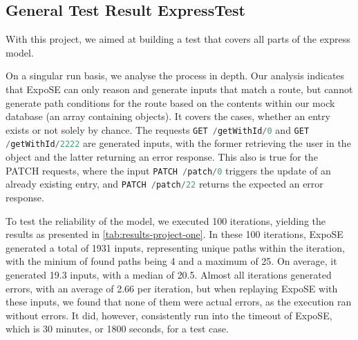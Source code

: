 \subsection{General Test Result ExpressTest}
With this project, we aimed at building a test that covers all parts of the express model.

On a singular run basis, we analyse the process in depth.
Our analysis indicates that ExpoSE can only reason and generate inputs that match a route, but cannot generate path conditions for the route based on the contents within our mock database (an array containing objects). It covers the cases, whether an entry exists or not solely by chance. The requests \lstinline[language=JavaScript]{GET /getWithId/0}
and \lstinline[language=JavaScript]{GET /getWithId/2222}
are generated inputs, with the former retrieving the user in the object and the latter returning an error response. This also is true for the PATCH requests, where the input \lstinline[language=JavaScript]{PATCH /patch/0} 
triggers the update of an already existing entry, and \lstinline[language=JavaScript]{PATCH /patch/22} returns the expected an error response.



To test the reliability of the model, we executed 100 iterations, yielding  the results as presented in \autoref{tab:results-project-one}. 
In these 100 iterations, ExpoSE generated a total of 1931 inputs, representing unique paths within the iteration, with the minium of found paths being 4 and a maximum of 25. On average, it generated 19.3 inputs, with  a median of 20.5. Almost all iterations generated errors, with an average of 2.66 per iteration, but when replaying ExpoSE with these inputs, we found that none of them were actual errors, as the execution ran without errors.
It did, however, consistently run into the timeout of ExpoSE, which is 30 minutes, or 1800 seconds, for a test case.

